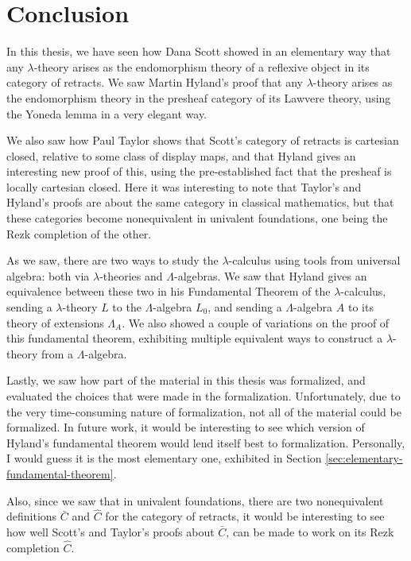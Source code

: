 \chapter{Conclusion}
In this thesis, we have seen how Dana Scott showed in an elementary way that any $ \lambda $-theory arises as the endomorphism theory of a reflexive object in its category of retracts. We saw Martin Hyland's proof that any $ \lambda $-theory arises as the endomorphism theory in the presheaf category of its Lawvere theory, using the Yoneda lemma in a very elegant way.

We also saw how Paul Taylor shows that Scott's category of retracts is cartesian closed, relative to some class of display maps, and that Hyland gives an interesting new proof of this, using the pre-established fact that the presheaf is locally cartesian closed. Here it was interesting to note that Taylor's and Hyland's proofs are about the same category in classical mathematics, but that these categories become nonequivalent in univalent foundations, one being the Rezk completion of the other.

As we saw, there are two ways to study the $ \lambda $-calculus using tools from universal algebra: both via $ \lambda $-theories and $ \Lambda $-algebras. We saw that Hyland gives an equivalence between these two in his Fundamental Theorem of the $ \lambda $-calculus, sending a $ \lambda $-theory $ L $ to the $ \Lambda $-algebra $ L_0 $, and sending a $ \Lambda $-algebra $ A $ to its theory of extensions $ \Lambda_A $. We also showed a couple of variations on the proof of this fundamental theorem, exhibiting multiple equivalent ways to construct a $ \lambda $-theory from a $ \Lambda $-algebra.

Lastly, we saw how part of the material in this thesis was formalized, and evaluated the choices that were made in the formalization. Unfortunately, due to the very time-consuming nature of formalization, not all of the material could be formalized. In future work, it would be interesting to see which version of Hyland's fundamental theorem would lend itself best to formalization. Personally, I would guess it is the most elementary one, exhibited in Section \ref{sec:elementary-fundamental-theorem}.

Also, since we saw that in univalent foundations, there are two nonequivalent definitions $ \bar C $ and $ \hat C $ for the category of retracts, it would be interesting to see how well Scott's and Taylor's proofs about $ \bar C $, can be made to work on its Rezk completion $ \hat C $.
